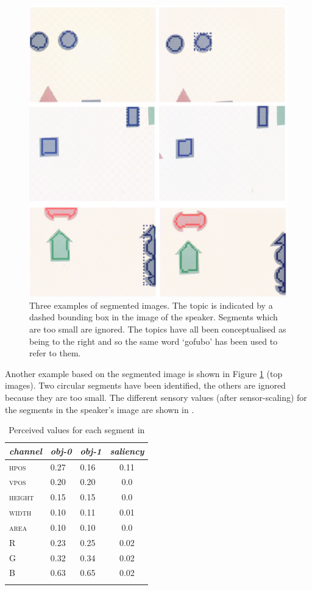 \begin{figure}[hbtp]
\begin{center}
\includegraphics[width=0.8\columnwidth]{chap7/figs/plate-10.pdf}
\end{center}
\caption{Three examples of segmented images. The 
topic is indicated by a dashed bounding box in the 
image of the speaker. Segments which are too small 
are ignored. The topics have all been conceptualised
as being to the right and so the same word 
`gofubo' has been used to refer to them. }
\label{f:plate-10}
\end{figure}

Another example based on the segmented image is shown in Figure 
\ref{f:plate-10} (top images). Two circular segments
have been identified, the others are ignored because they are 
too small. The different sensory values (after sensor-scaling)
for the segments in the speaker's image are shown in . 


\begin{table}[t]
\begin{center}
\begin{tabular}{  l   l   l   c  } \lsptoprule
{\itshape channel}& {\itshape obj-0} & {\itshape obj-1} & {\itshape saliency}\\ \midrule
\textsc{hpos} & 0.27 & 0.16 & 0.11\\ 
\textsc{vpos} & 0.20 & 0.20 & 0.0\\ 
\textsc{height} & 0.15 & 0.15 & 0.0\\ 
\textsc{width} & 0.10 & 0.11 & 0.01\\ 
\textsc{area} & 0.10 & 0.10 & 0.0\\ 
\textsc{R} & 0.23 & 0.25 & 0.02\\ 
\textsc{G} & 0.32 & 0.34 & 0.02\\ 
\textsc{B} & 0.63 & 0.65 & 0.02\\ 
\lspbottomrule
\end{tabular}
\caption{Perceived values for each segment in 
\label{tab:t-plate10}}
\end{center}
\end{table}

